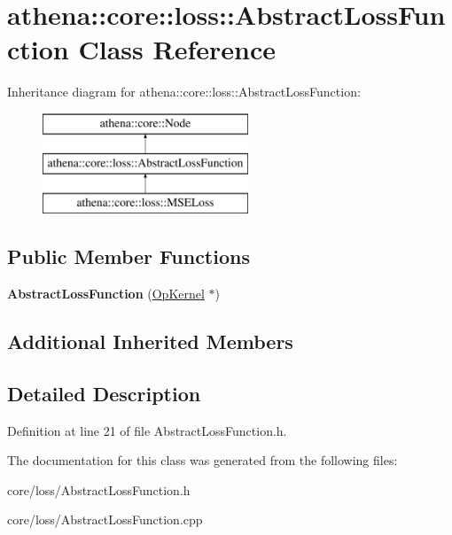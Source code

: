 \hypertarget{classathena_1_1core_1_1loss_1_1_abstract_loss_function}{}\section{athena\+:\+:core\+:\+:loss\+:\+:Abstract\+Loss\+Function Class Reference}
\label{classathena_1_1core_1_1loss_1_1_abstract_loss_function}
Inheritance diagram for athena\+:\+:core\+:\+:loss\+:\+:Abstract\+Loss\+Function\+:\begin{figure}[H]
\begin{center}
\leavevmode
\includegraphics[height=3.000000cm]{d7/d32/classathena_1_1core_1_1loss_1_1_abstract_loss_function}
\end{center}
\end{figure}
\subsection*{Public Member Functions}
\begin{DoxyCompactItemize}
\item 
\mbox{\label{classathena_1_1core_1_1loss_1_1_abstract_loss_function_afdb95a15043e5b1951417e6453edd539}} 
{\bfseries Abstract\+Loss\+Function} (\mbox{\hyperlink{classathena_1_1core_1_1_op_kernel}{Op\+Kernel}} $\ast$)
\end{DoxyCompactItemize}
\subsection*{Additional Inherited Members}


\subsection{Detailed Description}


Definition at line 21 of file Abstract\+Loss\+Function.\+h.



The documentation for this class was generated from the following files\+:\begin{DoxyCompactItemize}
\item 
core/loss/Abstract\+Loss\+Function.\+h\item 
core/loss/Abstract\+Loss\+Function.\+cpp\end{DoxyCompactItemize}
